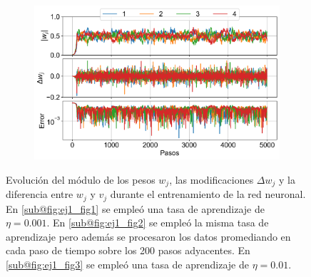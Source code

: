 \documentclass[aps,prb,twocolumn,superscriptaddress,floatfix,longbibliography]{revtex4-2}
\begin{document}
\begin{figure}
\begin{subfigure}[b]{0.3\textwidth}
      \caption{\label{fig:ej1_fig2}}
  \end{subfigure}
  \hfill
  \begin{subfigure}[b]{0.3\textwidth}
      \centering
      \includegraphics[width=\textwidth]{ej1_fig3.png}
      \caption{\label{fig:ej1_fig3}}
  \end{subfigure}
     \caption{Evolución del módulo de los pesos $w_j$, las modificaciones $\Delta w_j$ y la diferencia entre $w_j$ y $v_j$ durante el entrenamiento de la red neuronal. En \ref{sub@fig:ej1_fig1} se empleó una tasa de aprendizaje de $\eta = 0.001$. En \ref{sub@fig:ej1_fig2} se empleó la misma tasa de aprendizaje pero además se procesaron los datos promediando en cada paso de tiempo sobre los 200 pasos adyacentes. En \ref{sub@fig:ej1_fig3} se empleó una tasa de aprendizaje de $\eta = 0.01$.}
     \label{fig:three graphs}
\end{figure}
\end{document}
